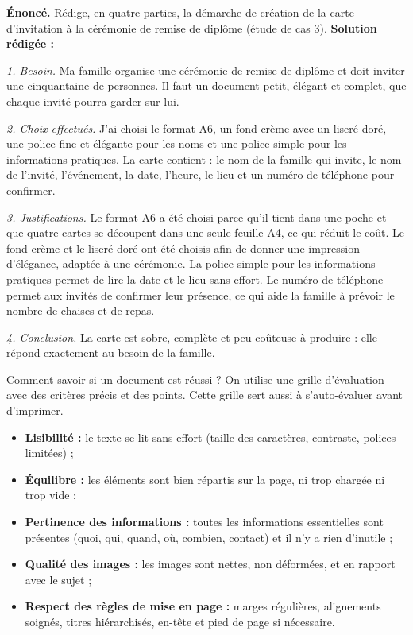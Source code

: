 \documentclass[11pt]{article}
\newcommand{\cle}[1]{{\popxbold\color{popdark}#1}}
\newcounter{popsec}
\newcounter{popsub}
\newcommand{\courssub}[1]{%
  \stepcounter{popsub}%
  \par\vspace{9pt}\noindent{\popxbold\fontsize{11.5}{13}\selectfont\color{popink}{\color{poporange}\thepopsec.\thepopsub}\hspace{6pt}#1}\par\nopagebreak\vspace{4pt}
}
\begin{document}
\begin{exoresolu}
\textbf{Énoncé.} Rédige, en quatre parties, la démarche de création de la carte d'invitation à la cérémonie de remise de diplôme (étude de cas 3).
\tcblower
\textbf{Solution rédigée :}

\emph{1. Besoin.} Ma famille organise une cérémonie de remise de diplôme et doit inviter une cinquantaine de personnes. Il faut un document petit, élégant et complet, que chaque invité pourra garder sur lui.

\emph{2. Choix effectués.} J'ai choisi le format A6, un fond crème avec un liseré doré, une police fine et élégante pour les noms et une police simple pour les informations pratiques. La carte contient : le nom de la famille qui invite, le nom de l'invité, l'événement, la date, l'heure, le lieu et un numéro de téléphone pour confirmer.

\emph{3. Justifications.} Le format A6 a été choisi parce qu'il tient dans une poche et que quatre cartes se découpent dans une seule feuille A4, ce qui réduit le coût. Le fond crème et le liseré doré ont été choisis afin de donner une impression d'élégance, adaptée à une cérémonie. La police simple pour les informations pratiques permet de lire la date et le lieu sans effort. Le numéro de téléphone permet aux invités de confirmer leur présence, ce qui aide la famille à prévoir le nombre de chaises et de repas.

\emph{4. Conclusion.} La carte est sobre, complète et peu coûteuse à produire : elle répond exactement au besoin de la famille.
\end{exoresolu}

\courssub{Évaluer un document de PAO}

Comment savoir si un document est réussi ? On utilise une \cle{grille d'évaluation} avec des critères précis et des points. Cette grille sert aussi à s'auto-évaluer avant d'imprimer.

\begin{aretenir}
\begin{itemize}
  \item \textbf{Lisibilité :} le texte se lit sans effort (taille des caractères, contraste, polices limitées) ;
  \item \textbf{Équilibre :} les éléments sont bien répartis sur la page, ni trop chargée ni trop vide ;
  \item \textbf{Pertinence des informations :} toutes les informations essentielles sont présentes (quoi, qui, quand, où, combien, contact) et il n'y a rien d'inutile ;
  \item \textbf{Qualité des images :} les images sont nettes, non déformées, et en rapport avec le sujet ;
  \item \textbf{Respect des règles de mise en page :} marges régulières, alignements soignés, titres hiérarchisés, en-tête et pied de page si nécessaire.
\end{itemize}
\end{aretenir}
\end{document}
